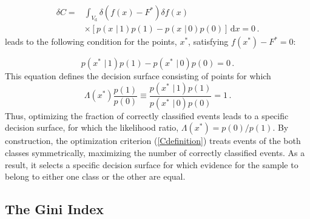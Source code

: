 \documentclass[prd, twocolumn, lengthcheck, superscriptaddress, showpacs, letterpaper, nofootinbib]{revtex4-1}
\newcommand\given{\,\,|\,}
\newcommand\auxvec{x}
\newcommand\Vdata{V_\mathrm{d}}
\newcommand\Ft{\ensuremath{F^\ast}}
\newcommand\auxvect{\auxvec^{\ast}}
\newcommand\diff{\, \mathrm{d}}
\begin{document}
\begin{align}
\label{Cvariation}
\delta C =& \int_{\Vdata}\! \delta\left(f(\auxvec) - \Ft \right)\delta f(\auxvec) \nonumber \\
            &\times \left[p(\auxvec \given 1)p(1) - p(\auxvec \given 0)p(0)\right] \diff \auxvec = 0 \,.
\end{align}
leads to the following condition for the points, $\auxvect$, satisfying $f(\auxvect) - \Ft = 0$:

\begin{equation}
\label{Ccondition}
p(\auxvect \given 1)p(1) - p(\auxvect \given 0)p(0) = 0\,.
\end{equation}
This equation defines the decision surface consisting of points for which 
\begin{equation}
\label{Csurface}
\Lambda(\auxvect)\frac{p(1)}{p(0)} \equiv \frac{p(\auxvect \given 1)p(1)}{p(\auxvect \given 0)p(0)} = 1\,.
\end{equation} 
Thus, optimizing the fraction of correctly classified events leads to a specific decision surface, for which the likelihood ratio, $\Lambda(\auxvect) = p(0)/p(1)$. By construction, the optimization criterion (\ref{Cdefinition}) treats events of the both classes symmetrically, maximizing the number of correctly classified events. As a result, it selects a specific decision surface for which evidence for the sample to belong to either one class or the other are equal. 


\subsection{The Gini Index}
\end{document}
